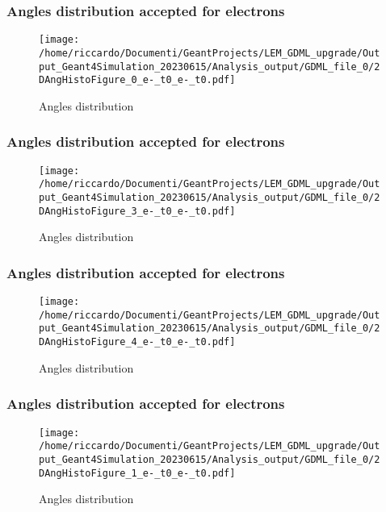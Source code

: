 \documentclass[8pt]{beamer}
\begin{document}
        \begin{frame}
            \frametitle{Angles distribution accepted for electrons}
        
        \begin{figure}[h]
            \centering
            \texttt{[image: /home/riccardo/Documenti/GeantProjects/LEM\_GDML\_upgrade/Output\_Geant4Simulation\_20230615/Analysis\_output/GDML\_file\_0/2DAngHistoFigure\_0\_e-\_t0\_e-\_t0.pdf]}
            \caption{Angles distribution}
        \end{figure}
        
        \end{frame}
        
        \begin{frame}
            \frametitle{Angles distribution accepted for electrons}
        
        \begin{figure}[h]
            \centering
            \texttt{[image: /home/riccardo/Documenti/GeantProjects/LEM\_GDML\_upgrade/Output\_Geant4Simulation\_20230615/Analysis\_output/GDML\_file\_0/2DAngHistoFigure\_3\_e-\_t0\_e-\_t0.pdf]}
            \caption{Angles distribution}
        \end{figure}
        
        \end{frame}
        
        \begin{frame}
            \frametitle{Angles distribution accepted for electrons}
        
        \begin{figure}[h]
            \centering
            \texttt{[image: /home/riccardo/Documenti/GeantProjects/LEM\_GDML\_upgrade/Output\_Geant4Simulation\_20230615/Analysis\_output/GDML\_file\_0/2DAngHistoFigure\_4\_e-\_t0\_e-\_t0.pdf]}
            \caption{Angles distribution}
        \end{figure}
        
        \end{frame}
        
        \begin{frame}
            \frametitle{Angles distribution accepted for electrons}
        
        \begin{figure}[h]
            \centering
            \texttt{[image: /home/riccardo/Documenti/GeantProjects/LEM\_GDML\_upgrade/Output\_Geant4Simulation\_20230615/Analysis\_output/GDML\_file\_0/2DAngHistoFigure\_1\_e-\_t0\_e-\_t0.pdf]}
            \caption{Angles distribution}
        \end{figure}
        
        \end{frame}
        
\end{document}
